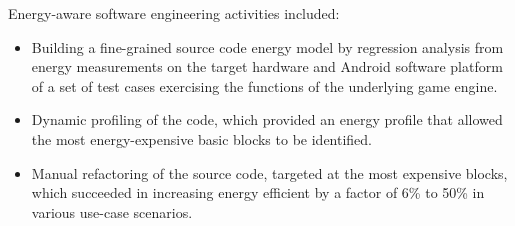 \documentclass[oneside]{book}
\begin{document}
Energy-aware software engineering activities included:
\begin{itemize}
\item
Building a fine-grained source code energy model by regression
analysis from energy measurements on the target hardware and Android
software platform of a set of test cases exercising the functions of
the underlying game engine.

\item

Dynamic profiling of the code, which provided an energy profile that
allowed the most energy-expensive basic blocks to be identified.

\item Manual refactoring of the source code, targeted at the most
  expensive blocks, which succeeded in increasing energy efficient by
  a factor of 6\% to 50\% in various use-case scenarios.
\end{itemize}



\end{document}
